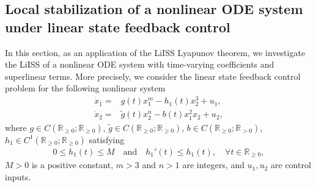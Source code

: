 \documentclass[onecolumn]{autart}
\newenvironment{proof of Prop.ODE}{{\it Proof of Proposition~\ref{Prop.ODE}:\enspace}}{\hfill $\blacksquare$\par}
\newenvironment{proof of PDE}{{\it Proof of Proposition \ref{Prop.8}:\enspace}}{\hfill $\blacksquare$\par}
\begin{document}
{\subsection{Local stabilization of
a nonlinear ODE system under linear state feedback control}\label{sec:5.1}
In this section, as an application of the LiISS Lyapunov theorem, we  investigate  the LiISS of  a  nonlinear ODE  system with time-varying coefficients and superlinear terms.   More {precisely}, we consider the linear state feedback control problem for the following nonlinear system
\begin{subequations}\label{nonlinear ODE}
\begin{align}
	\dot{x}_1 =&g(t)x^m_1-h_1(t)x_2^3 +u_1  , \\
	\dot{x}_2 =&{\tilde{g}(t)x^n_2}-b(t)x_1^2x_2+u_2,  \label{x2}
\end{align}
\end{subequations}
where $g\in C(\mathbb{R}_{\geq 0};\mathbb{R}_{\geq 0})$, ${\tilde{g}\in C(\mathbb{R}_{\geq 0};\mathbb{R}_{\geq 0})}$,   $b\in C(\mathbb{R}_{\geq 0};\mathbb{R}_{>0}) $,  $h_1\in C^1(\mathbb{R}_{\geq 0};\mathbb{R}_{\geq 0}) $ satisfying
\begin{align}\label{condition-h1}
0\leq h_1(t)\leq M\quad \text{and} \quad h_1'(t)\leq h_1(t),\quad \forall t\in \mathbb{R}_{\geq 0},
\end{align}
$M>0$ is a positive constant,    {$m>3$ and $n>1$} are  integers, and $u_1,u_2 $ are control inputs.

}
\end{document}
